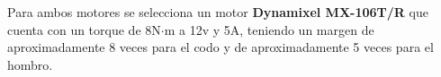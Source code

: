 Para ambos motores se selecciona un motor \textbf{Dynamixel MX-106T/R} que cuenta con un torque de 8N$\cdot$m a 12v y 5A, teniendo un margen de aproximadamente 8 veces para el codo y de aproximadamente 5 veces para el hombro.






